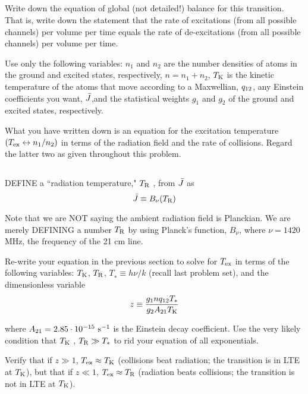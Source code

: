 \documentclass[11pt]{article}
\begin{document}
\def\TK{{T_{\rm K}}}
\def\TR{{T_{\rm R}}}
\subsection{} Write down the equation of global (not detailed!) balance for
this transition. That is, write down the statement that the rate of excitations
(from all possible channels) per volume per time equals the rate of
de-excitations (from all possible channels) per volume per time.

Use only the following variables: $n_1$ and $n_2$ are the number densities of atoms
in the ground and excited states, respectively, $n = n_1 + n_2$, $\TK$ is the kinetic
temperature of the atoms that move according to a Maxwellian, ${q_{12}}$, any Einstein
coefficients you want, ${\bar J}$,and the statistical weights $g_1$ and $g_2$
of the ground and excited states, respectively. 

What you have written down is an equation for the excitation temperature 
$({T_{\rm ex}}\leftrightarrow n_1/n_2)$
in terms of the radiation field and the rate of collisions. Regard the
latter two as given throughout this problem.

\subsection{} DEFINE a ``radiation temperature," $\TR$ , from ${\bar J}$ as
\begin{equation}
\Jbar\equiv B_\nu(\TR)
\end{equation}

Note that we are NOT saying the ambient radiation field is Planckian. We are
merely DEFINING a number $\TR$ by using Planck's function, $B_\nu$, 
where $\nu=1420$ MHz,
the frequency of the 21 cm line.

Re-write your equation in the previous section to solve for ${T_{\rm ex}}$ in terms of the following
variables: $\TK$, $\TR$, $T_∗\equiv h\nu/k$ (recall last problem set), and the dimensionless
variable
\begin{equation}
z\equiv\frac{g_1 n\qot T_*}{g_2 A_{21}\TK}
\end{equation}

where ${A_{21}}=2.85\cdot10^{-15}~{\rm s}^{-1}$ is the Einstein decay coefficient.
Use the very likely condition that $\TK$ , $\TR\gg T_*$ to rid your equation of all
exponentials.

Verify that if $z\gg1$, $\Tex\approx\TK$ (collisions beat radiation; the transition is in
LTE at $\TK$), but that if $z\ll1$, $\Tex\approx\TR$ (radiation beats collisions; the
transition is not in LTE at $\TK$).
\end{document}
